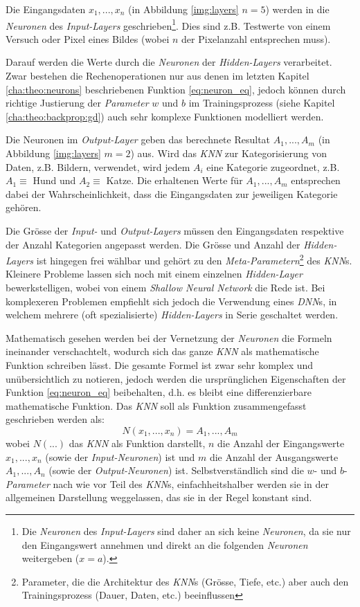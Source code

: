 Die Eingangsdaten $x_1,...,x_n$ (in Abbildung \ref{img:layers} $n=5$) werden in die \textit{Neuronen} des \textit{Input-Layers} geschrieben\footnote{Die \textit{Neuronen} des \textit{Input-Layers} sind daher an sich keine \textit{Neuronen}, da sie nur den Eingangswert annehmen und direkt an die folgenden \textit{Neuronen} weitergeben ($x = a$).}. Dies sind z.B. Testwerte von einem Versuch oder Pixel eines Bildes (wobei $n$ der Pixelanzahl entsprechen muss).

Darauf werden die Werte durch die \textit{Neuronen} der \textit{Hidden-Layers} verarbeitet. Zwar bestehen die Rechenoperationen nur aus denen im letzten Kapitel \ref{cha:theo:neurons} beschriebenen Funktion \ref{eq:neuron_eq}, jedoch können durch richtige Justierung der \textit{Parameter} $w$ und $b$ im Trainingsprozess (siehe Kapitel \ref{cha:theo:backprop:gd}) auch sehr komplexe Funktionen modelliert werden.

Die Neuronen im \textit{Output-Layer} geben das berechnete Resultat $A_1,...,A_m$ (in Abbildung \ref{img:layers} $m=2$) aus. Wird das \textit{KNN} zur Kategorisierung von Daten, z.B. Bildern, verwendet, wird jedem $A_i$ eine Kategorie zugeordnet, z.B. $A_1 \equiv$ Hund und $A_2 \equiv$ Katze. Die erhaltenen Werte für $A_1,...,A_m$ entsprechen dabei der Wahrscheinlichkeit, dass die Eingangsdaten zur jeweiligen Kategorie gehören.

Die Grösse der \textit{Input-} und \textit{Output-Layers} müssen den Eingangsdaten respektive der Anzahl Kategorien angepasst werden. Die Grösse und Anzahl der \textit{Hidden-Layers} ist hingegen frei wählbar und gehört zu den \textit{Meta-Parametern}\footnote{Parameter, die die Architektur des \textit{KNN}s (Grösse, Tiefe, etc.) aber auch den Trainingsprozess (Dauer, Daten, etc.) beeinflussen} des \textit{KNN}s. Kleinere Probleme lassen sich noch mit einem einzelnen \textit{Hidden-Layer} bewerkstelligen, wobei von einem \textit{Shallow Neural Network} die Rede ist. Bei komplexeren Problemen empfiehlt sich jedoch die Verwendung eines \textit{DNN}s, in welchem mehrere (oft spezialisierte) \textit{Hidden-Layers} in Serie geschaltet werden.

Mathematisch gesehen werden bei der Vernetzung der \textit{Neuronen} die Formeln ineinander verschachtelt, wodurch sich das ganze \textit{KNN} als mathematische Funktion schreiben lässt. Die gesamte Formel ist zwar sehr komplex und unübersichtlich zu notieren, jedoch werden die ursprünglichen Eigenschaften der Funktion \ref{eq:neuron_eq} beibehalten, d.h. es bleibt eine differenzierbare mathematische Funktion. Das \textit{KNN} soll als Funktion zusammengefasst geschrieben werden als:
\begin{equation}\label{eq:ann}
N(x_1,...,x_n) = A_1,...,A_m
\end{equation}
wobei $N(...)$ das \textit{KNN} als Funktion darstellt, $n$ die Anzahl der Eingangswerte $x_1,...,x_n$ (sowie der \textit{Input-Neuronen}) ist und $m$ die Anzahl der Ausgangswerte $A_1,...,A_n$ (sowie der \textit{Output-Neuronen}) ist. Selbstverständlich sind die $w$- und $b$-\textit{Parameter} nach wie vor Teil des \textit{KNN}s, einfachheitshalber werden sie in der allgemeinen Darstellung weggelassen, das sie in der Regel konstant sind.


